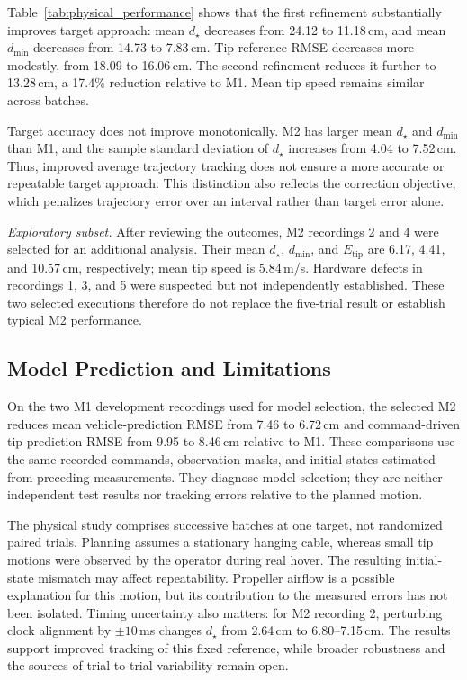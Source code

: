 Table~\ref{tab:physical_performance} shows that the first
refinement substantially improves target approach: mean
$d_\star$ decreases from 24.12 to 11.18\,cm, and mean
$d_{\min}$ decreases from 14.73 to 7.83\,cm. Tip-reference
RMSE decreases more modestly, from 18.09 to 16.06\,cm.
The second refinement reduces it further to 13.28\,cm,
a 17.4\% reduction relative to M1. Mean tip speed remains
similar across batches.

Target accuracy does not improve monotonically. M2 has larger
mean $d_\star$ and $d_{\min}$ than M1, and the sample standard
deviation of $d_\star$ increases from 4.04 to 7.52\,cm.
Thus, improved average trajectory tracking does not ensure
a more accurate or repeatable target approach. This distinction
also reflects the correction objective, which penalizes
trajectory error over an interval rather than target error alone.

\noindent\emph{Exploratory subset.}
After reviewing the outcomes, M2 recordings 2 and 4 were
selected for an additional analysis. Their mean $d_\star$,
$d_{\min}$, and $E_{\mathrm{tip}}$ are 6.17, 4.41, and
10.57\,cm, respectively; mean tip speed is 5.84\,m/s.
Hardware defects in recordings 1, 3, and 5 were suspected
but not independently established. These two selected
executions therefore do not replace the five-trial result
or establish typical M2 performance.

\subsection{Model Prediction and Limitations}
\label{subsec:prediction_results}

On the two M1 development recordings used for model selection,
the selected M2 reduces mean vehicle-prediction RMSE from
7.46 to 6.72\,cm and command-driven tip-prediction RMSE from
9.95 to 8.46\,cm relative to M1. These comparisons use the
same recorded commands, observation masks, and initial states
estimated from preceding measurements. They diagnose model
selection; they are neither independent test results nor
tracking errors relative to the planned motion.

The physical study comprises successive batches at one target,
not randomized paired trials. Planning assumes a stationary
hanging cable, whereas small tip motions were observed by the
operator during real hover. The resulting initial-state
mismatch may affect repeatability. Propeller airflow is a
possible explanation for this motion, but its contribution
to the measured errors has not been isolated.
Timing uncertainty also matters: for M2 recording 2,
perturbing clock alignment by $\pm10$\,ms changes $d_\star$
from 2.64\,cm to 6.80--7.15\,cm. The results support improved
tracking of this fixed reference, while broader robustness
and the sources of trial-to-trial variability remain open.

